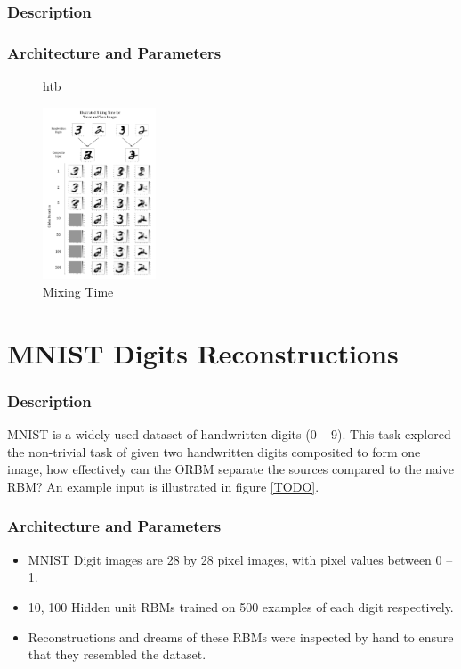     \subsubsection{Description}

    \subsubsection{Architecture and Parameters}

    \begin{figure}{htb}
      \begin{center}
        \includegraphics[width=0.3\textwidth]{Assets/results/Mixing Results.png}
      \end{center}
      \caption{Mixing Time}
      \label{F:MNIST-Mixing-Time}
    \end{figure}

    \section{MNIST Digits Reconstructions}

    \subsubsection{Description}

    MNIST is a widely used dataset of handwritten digits (0 -- 9). This task explored the non-trivial task of given two handwritten digits composited to form one image, how effectively can the ORBM separate the sources compared to the naive RBM? An example input is illustrated in figure \ref{TODO}.

    \subsubsection{Architecture and Parameters}

    \begin{itemize}
      \item MNIST Digit images are 28 by 28 pixel images, with pixel values between 0 -- 1.
      \item 10, 100 Hidden unit RBMs trained on 500 examples of each digit respectively.
      \item Reconstructions and dreams of these RBMs were inspected by hand to ensure that they resembled the dataset.
    \end{itemize}

